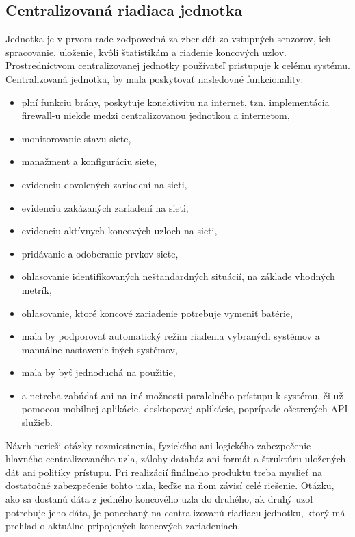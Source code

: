 \documentclass[12pt,a4paper,oneside,openright]{report}
\begin{document}
\subsection{Centralizovaná riadiaca jednotka} 
Jednotka je v prvom rade zodpovedná za zber dát zo vstupných senzorov, ich spracovanie, uloženie, kvôli štatistikám a riadenie koncových uzlov. Prostredníctvom centralizovanej jednotky používateľ pristupuje k celému systému. Centralizovaná jednotka, by mala poskytovať nasledovné funkcionality:
\begin{itemize}
	\item plní funkciu brány, poskytuje konektivitu na internet, tzn. implementácia firewall-u niekde medzi centralizovanou jednotkou a internetom,
	\item monitorovanie stavu siete,
	\item manažment a konfiguráciu siete,
	\item evidenciu dovolených zariadení na sieti,
	\item evidenciu zakázaných zariadení na sieti,
	\item evidenciu aktívnych koncových uzloch na sieti,
	\item pridávanie a odoberanie prvkov siete,
	\item ohlasovanie identifikovaných neštandardných situácií, na základe vhodných metrík,
	\item ohlasovanie, ktoré koncové zariadenie potrebuje vymeniť batérie,
	\item mala by podporovať automatický režim riadenia vybraných systémov a manuálne nastavenie iných systémov,
	\item mala by byť jednoduchá na použitie,
	\item a netreba zabúdať ani na iné možnosti paralelného prístupu k systému, či už pomocou mobilnej aplikácie, desktopovej aplikácie, poprípade ošetrených API služieb.
\end{itemize}
\onehalfspacing

Návrh nerieši otázky rozmiestnenia, fyzického ani logického zabezpečenie hlavného centralizovaného uzla, zálohy databáz ani formát a štruktúru uložených dát ani politiky prístupu. Pri realizácií finálneho produktu treba myslieť na dostatočné zabezpečenie tohto uzla, keďže na ňom závisí celé riešenie.
Otázku, ako sa dostanú dáta z jedného koncového uzla do druhého, ak druhý uzol potrebuje jeho dáta, je ponechaný na centralizovanú riadiacu jednotku, ktorý má prehľad o aktuálne pripojených koncových zariadeniach.
\end{document}
